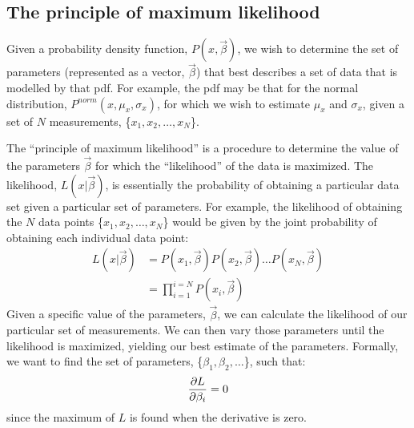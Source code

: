 \subsection{The principle of maximum likelihood}
Given a probability density function, $P(x,\vec\beta)$, we wish to determine the set of parameters (represented as a vector, $\vec\beta$) that best describes a set of data that is modelled by that pdf.  For example, the pdf may be that for the normal distribution, $P^{norm}(x,\mu_x,\sigma_x)$, for which we wish to estimate $\mu_x$ and $\sigma_x$, given a set of $N$ measurements, \{$x_1, x_2, \dots,x_N$\}.

The ``principle of maximum likelihood'' is a procedure to determine the value of the parameters $\vec\beta$ for which the ``likelihood'' of the data is maximized. The likelihood, $L(x|\vec\beta)$, is essentially the probability of obtaining a particular data set given a particular set of parameters. For example, the likelihood of obtaining the $N$ data points \{$x_1, x_2, \dots,x_N$\} would be given by the joint probability of obtaining each individual data point:
\begin{align}
L(x|\vec\beta)&=P(x_1,\vec\beta)P(x_2,\vec\beta)\dots P(x_N,\vec\beta)\nonumber\\
&=\prod_{i=1}^{i=N}P(x_i,\vec\beta)
\end{align}
Given a specific value of the parameters, $\vec\beta$, we can calculate the likelihood of our particular set of measurements. We can then vary those parameters until the likelihood is maximized, yielding our best estimate of the parameters. Formally, we want to find the set of parameters, \{$\beta_1,\beta_2,\dots$\}, such that:
\begin{align}
\frac{\partial L}{\partial \beta_i}=0
\end{align}
since the maximum of $L$ is found when the derivative is zero.
